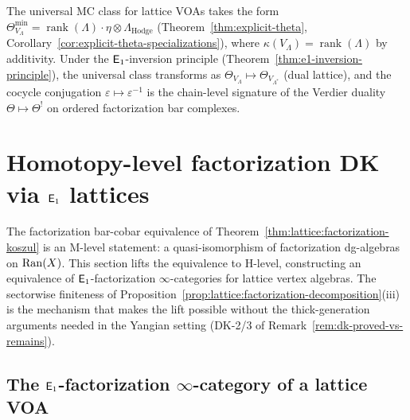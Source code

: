 \begin{remark}
The universal MC class for lattice VOAs takes the form
$\Theta_{V_\Lambda}^{\min} = \operatorname{rank}(\Lambda) \cdot
\eta \otimes \Lambda_{\mathrm{Hodge}}$
(Theorem~\ref{thm:explicit-theta},
Corollary~\ref{cor:explicit-theta-specializations}),
where $\kappa(V_\Lambda) = \operatorname{rank}(\Lambda)$ by
additivity.  Under the $\mathsf{E}_1$-inversion principle
(Theorem~\ref{thm:e1-inversion-principle}), the universal class
transforms as
$\Theta_{V_\Lambda} \mapsto \Theta_{V_{\Lambda^*}}$
(dual lattice), and the cocycle conjugation
$\varepsilon \mapsto \varepsilon^{-1}$ is the chain-level
signature of the Verdier duality
$\Theta \mapsto \Theta^!$ on ordered factorization
bar complexes.
\end{remark}



\section{Homotopy-level factorization DK via $\mathsf{E}_1$ lattices}
\label{sec:lattice:homotopy-factorization-dk}


The factorization bar-cobar equivalence of
Theorem~\ref{thm:lattice:factorization-koszul} is an M-level statement:
a quasi-isomorphism of factorization dg-algebras on $\operatorname{Ran}(X)$.  This
section lifts the equivalence to H-level, constructing an equivalence of
$\mathsf{E}_1$-factorization $\infty$-categories for lattice vertex algebras.
The sectorwise finiteness of
Proposition~\ref{prop:lattice:factorization-decomposition}(iii) is the
mechanism that makes the lift possible without the thick-generation
arguments needed in the Yangian setting (DK-2/3 of
Remark~\ref{rem:dk-proved-vs-remains}).


\subsection{The $\mathsf{E}_1$-factorization $\infty$-category of a lattice VOA}

